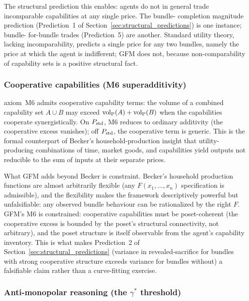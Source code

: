 The structural prediction this enables: agents do not in general
trade incomparable capabilities at any single price.  The bundle-
completion magnitude prediction (Prediction~1 of
Section~\ref{sec:structural_predictions}) is one instance; bundle-
for-bundle trades (Prediction~5) are another.  Standard utility
theory, lacking incomparability, predicts a single price for any
two bundles, namely the price at which the agent is indifferent;
GFM does not, because non-comparability of capability sets is a
positive structural fact.

\subsubsection{Cooperative capabilities (M6 superadditivity)}

\citep[Proposition~1]{lasser2026poset} axiom~M6 admits cooperative
capability terms: the volume of a combined capability set $A \cup B$
may exceed ${\operatorname{vol}_{\mathrm{P}}}(A) + {\operatorname{vol}_{\mathrm{P}}}(B)$ when the capabilities cooperate
synergistically.  On $P_{\mathrm{std}}$, M6 reduces to ordinary additivity (the
cooperative excess vanishes); off $P_{\mathrm{std}}$, the cooperative term is
generic.  This is the formal counterpart of Becker's
household-production insight \citep{becker1965theory,becker1981treatise}
that utility-producing combinations of time, market goods, and
capabilities yield outputs not reducible to the sum of inputs at
their separate prices.

What GFM adds beyond Becker is constraint.  Becker's household
production functions are almost arbitrarily flexible (any
$F(x_1, \dots, x_n)$ specification is admissible), and the
flexibility makes the framework descriptively powerful but
unfalsifiable: any observed bundle behaviour can be rationalized by
the right $F$.  GFM's M6 is constrained: cooperative capabilities
must be poset-coherent (the cooperative excess is bounded by the
poset's structural connectivity, not arbitrary), and the
poset structure is itself observable from the agent's capability
inventory.  This is what makes Prediction~2 of
Section~\ref{sec:structural_predictions} (variance in
revealed-sacrifice for bundles with strong cooperative structure
exceeds variance for bundles without) a falsifiable claim rather
than a curve-fitting exercise.

\subsubsection{Anti-monopolar reasoning (the $\gamma^*$ threshold)}

